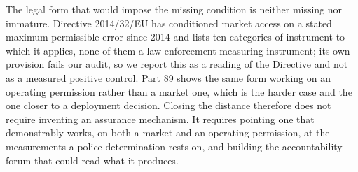 The legal form that would impose the missing condition is neither missing nor immature. Directive 2014/32/EU has conditioned market access on a stated maximum permissible error since 2014 and lists ten categories of instrument to which it applies, none of them a law-enforcement measuring instrument; its own provision fails our audit, so we report this as a reading of the Directive and not as a measured positive control. Part 89 shows the same form working on an operating permission rather than a market one, which is the harder case and the one closer to a deployment decision. Closing the distance therefore does not require inventing an assurance mechanism. It requires pointing one that demonstrably works, on both a market and an operating permission, at the measurements a police determination rests on, and building the accountability forum that could read what it produces.

